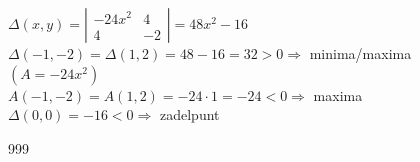 \documentclass[a4paper]{article}
\begin{document}
$\Delta(x, y) = \left|\begin{array}{cc}
    -24x^2 & 4  \\
    4      & -2
\end{array}\right| = 48x^2 - 16$ \\

$\Delta(-1, -2) = \Delta(1, 2) = 48 - 16 = 32 > 0 \Rightarrow$ minima/maxima \\

$\left(A = -24x^2\right)$ \\

$A(-1, -2) = A(1, 2) = -24\cdot1 = -24 < 0 \Rightarrow$ maxima \\

$\Delta(0, 0) = -16 < 0 \Rightarrow$ zadelpunt \\




\begin{thebibliography}{999}
\end{thebibliography}
\end{document}

